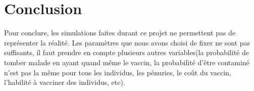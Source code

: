 \documentclass{report}
\begin{document}
\section{Conclusion}
Pour conclure, les simulations faites durant ce projet ne permettent pas de représenter la réalité.
Les paramètres que nous avons choisi de fixer ne sont pas suffisants, il faut prendre en compte
plusieurs autres variables(la probabilité de tomber malade en ayant quand même le vaccin,
la probabilité d’être contaminé n'est pas la même pour tous les individus, les pénuries, le coût du
vaccin, l'habilité à vacciner des individus, etc).
{}

\end{document}
